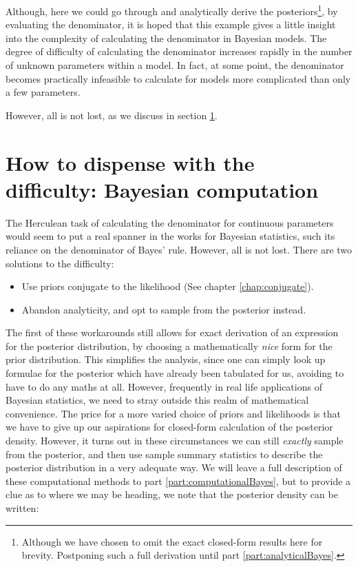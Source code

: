 \documentclass[11pt,fullpage]{book}
\begin{document}
Although, here we could go through and analytically derive the posteriors\footnote{Although we have chosen to omit the exact closed-form results here for brevity. Postponing such a full derivation until part \ref{part:analyticalBayes}.}, by evaluating the denominator, it is hoped that this example gives a little insight into the complexity of  calculating the denominator in Bayesian models. The degree of difficulty of calculating the denominator increases rapidly in the number of unknown parameters within a model. In fact, at some point, the denominator becomes practically infeasible to calculate for models more complicated than only a few parameters. 

However, all is not lost, as we discuss in section \ref{sec:Denominator_dispensingWithNumerator}.

\section{How to dispense with the difficulty: Bayesian computation}\label{sec:Denominator_dispensingWithNumerator}
The Herculean task of calculating the denominator for continuous parameters would seem to put a real spanner in the works for Bayesian statistics, such its reliance on the denominator of Bayes' rule. However, all is not lost. There are two solutions to the difficulty:

\begin{itemize}
\item Use priors conjugate to the likelihood (See chapter \ref{chap:conjugate}).
\item Abandon analyticity, and opt to sample from the posterior instead.
\end{itemize}

The first of these workarounds still allows for exact derivation of an expression for the posterior distribution, by choosing a mathematically \textit{nice} form for the prior distribution. This simplifies the analysis, since one can simply look up formulae for the posterior which have already been tabulated for us, avoiding to have to do any maths at all. However, frequently in real life applications of Bayesian statistics, we need to stray outside this realm of mathematical convenience. The price for a more varied choice of priors and likelihoods is that we have to give up our aspirations for closed-form calculation of the posterior density. However, it turns out in these circumstances we can still \textit{exactly} sample from the posterior, and then use sample summary statistics to describe the posterior distribution in a very adequate way. We will leave a full description of these computational methods to part \ref{part:computationalBayes}, but to provide a clue as to where we may be heading, we note that the posterior density can be written:
\end{document}
